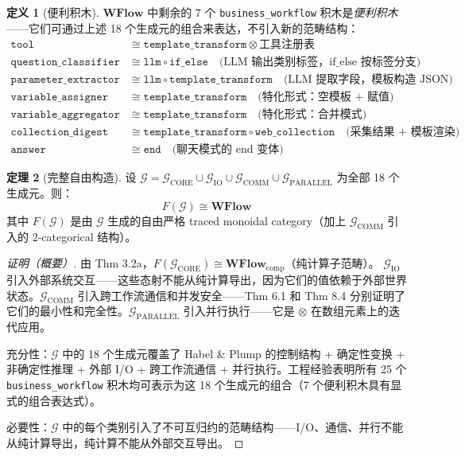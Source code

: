 \documentclass[11pt,a4paper]{article}
\theoremstyle{definition}
\newtheorem{theorem}{定理}[section]
\theoremstyle{definition}
\newtheorem{definition}[theorem]{定义}
\theoremstyle{remark}
\newcommand{\cat}[1]{\mathbf{#1}}
\newcommand{\catWFlow}{\cat{WFlow}}
\newcommand{\tensor}{\otimes}
\begin{document}
\begin{definition}[便利积木]
$\catWFlow$ 中剩余的 7 个 \texttt{business\_workflow} 积木是\emph{便利积木}——它们可通过上述 18 个生成元的组合来表达，不引入新的范畴结构：
\[
\begin{aligned}
\mathtt{tool} &\cong \mathtt{template\_transform} \otimes \text{工具注册表} \\
\mathtt{question\_classifier} &\cong \mathtt{llm} \circ \mathtt{if\_else} \quad\text{(LLM 输出类别标签，if\_else 按标签分支)} \\
\mathtt{parameter\_extractor} &\cong \mathtt{llm} \circ \mathtt{template\_transform} \quad\text{(LLM 提取字段，模板构造 JSON)} \\
\mathtt{variable\_assigner} &\cong \mathtt{template\_transform} \quad\text{(特化形式：空模板 + 赋值)} \\
\mathtt{variable\_aggregator} &\cong \mathtt{template\_transform} \quad\text{(特化形式：合并模式)} \\
\mathtt{collection\_digest} &\cong \mathtt{template\_transform} \circ \mathtt{web\_collection} \quad\text{(采集结果 + 模板渲染)} \\
\mathtt{answer} &\cong \mathtt{end} \quad\text{(聊天模式的 end 变体)}
\end{aligned}
\]
\end{definition}

\begin{theorem}[完整自由构造]\label{thm:free-construction-full}
设 $\mathcal{G} = \mathcal{G}_{\mathrm{CORE}} \cup \mathcal{G}_{\mathrm{IO}} \cup \mathcal{G}_{\mathrm{COMM}} \cup \mathcal{G}_{\mathrm{PARALLEL}}$ 为全部 18 个生成元。则：
\[
F(\mathcal{G}) \cong \catWFlow
\]
其中 $F(\mathcal{G})$ 是由 $\mathcal{G}$ 生成的自由严格 traced monoidal category（加上 $\mathcal{G}_{\mathrm{COMM}}$ 引入的 2-categorical 结构）。
\end{theorem}

\begin{proof}[证明（概要）]
由 Thm 3.2a，$F(\mathcal{G}_{\mathrm{CORE}}) \cong \catWFlow_{\mathrm{comp}}$（纯计算子范畴）。
$\mathcal{G}_{\mathrm{IO}}$ 引入外部系统交互——这些态射不能从纯计算导出，因为它们的值依赖于外部世界状态。$\mathcal{G}_{\mathrm{COMM}}$ 引入跨工作流通信和并发安全——Thm 6.1 和 Thm 8.4 分别证明了它们的最小性和完全性。$\mathcal{G}_{\mathrm{PARALLEL}}$ 引入并行执行——它是 $\tensor$ 在数组元素上的迭代应用。

充分性：$\mathcal{G}$ 中的 18 个生成元覆盖了 Habel \& Plump 的控制结构 + 确定性变换 + 非确定性推理 + 外部 I/O + 跨工作流通信 + 并行执行。工程经验表明所有 25 个 \texttt{business\_workflow} 积木均可表示为这 18 个生成元的组合（7 个便利积木具有显式的组合表达式）。

必要性：$\mathcal{G}$ 中的每个类别引入了不可互归约的范畴结构——I/O、通信、并行不能从纯计算导出，纯计算不能从外部交互导出。
\end{proof}
\end{document}
